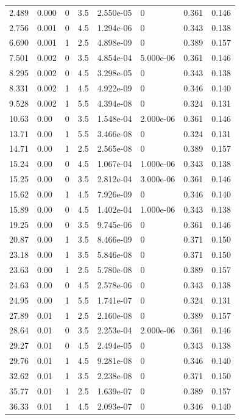 \documentclass[preview]{standalone}
\begin{document}
{{\begin{tabular}{L{1.2cm}C{1.2cm} C{0.3cm}C{0.5cm} C{1.4cm}C{1.4cm} C{1.4cm}C{1.4cm}}
  2.489  &  0.000  & 0     & 3.5 &  2.550e-05  & 0  & 0.361 &  0.146   \\ 
  2.756  &  0.001  & 0     & 4.5 &  1.294e-06  & 0  & 0.343 &  0.138   \\ 
  6.690  &  0.001  & 1     & 2.5 &  4.898e-09  & 0  & 0.389 &  0.157   \\ 
  7.501  &  0.002  & 0     & 3.5 &  4.854e-04  & 5.000e-06  & 0.361 &  0.146   \\ 
  8.295  &  0.002  & 0     & 4.5 &  3.298e-05  & 0  & 0.343 &  0.138   \\ 
  8.331  &  0.002  & 1     & 4.5 &  4.922e-09  & 0  & 0.346 &  0.140   \\ 
  9.528  &  0.002  & 1     & 5.5 &  4.394e-08  & 0  & 0.324 &  0.131   \\ 
  10.63  &  0.00  & 0     & 3.5 &  1.548e-04  & 2.000e-06  & 0.361 &  0.146   \\ 
  13.71  &  0.00  & 1     & 5.5 &  3.466e-08  & 0  & 0.324 &  0.131   \\ 
  14.71  &  0.00  & 1     & 2.5 &  2.565e-08  & 0  & 0.389 &  0.157   \\ 
  15.24  &  0.00  & 0     & 4.5 &  1.067e-04  & 1.000e-06  & 0.343 &  0.138   \\ 
  15.25  &  0.00  & 0     & 3.5 &  2.812e-04  & 3.000e-06  & 0.361 &  0.146   \\ 
  15.62  &  0.00  & 1     & 4.5 &  7.926e-09  & 0  & 0.346 &  0.140   \\ 
  15.89  &  0.00  & 0     & 4.5 &  1.402e-04  & 1.000e-06  & 0.343 &  0.138   \\ 
  19.25  &  0.00  & 0     & 3.5 &  9.745e-06  & 0  & 0.361 &  0.146   \\ 
  20.87  &  0.00  & 1     & 3.5 &  8.466e-09  & 0  & 0.371 &  0.150   \\ 
  23.18  &  0.00  & 1     & 3.5 &  5.846e-08  & 0  & 0.371 &  0.150   \\ 
  23.63  &  0.00  & 1     & 2.5 &  5.780e-08  & 0  & 0.389 &  0.157   \\ 
  24.63  &  0.00  & 0     & 4.5 &  2.578e-06  & 0  & 0.343 &  0.138   \\ 
  24.95  &  0.00  & 1     & 5.5 &  1.741e-07  & 0  & 0.324 &  0.131   \\ 
  27.89  &  0.01  & 1     & 2.5 &  2.160e-08  & 0  & 0.389 &  0.157   \\ 
  28.64  &  0.01  & 0     & 3.5 &  2.253e-04  & 2.000e-06  & 0.361 &  0.146   \\ 
  29.27  &  0.01  & 0     & 4.5 &  2.494e-05  & 0  & 0.343 &  0.138   \\ 
  29.76  &  0.01  & 1     & 4.5 &  9.281e-08  & 0  & 0.346 &  0.140   \\ 
  32.62  &  0.01  & 1     & 3.5 &  2.238e-08  & 0  & 0.371 &  0.150   \\ 
  35.77  &  0.01  & 1     & 2.5 &  1.639e-07  & 0  & 0.389 &  0.157   \\ 
  36.33  &  0.01  & 1     & 4.5 &  2.093e-07  & 0  & 0.346 &  0.140   \\ 
\hline 
\end{tabular} 

}}
\end{document}
